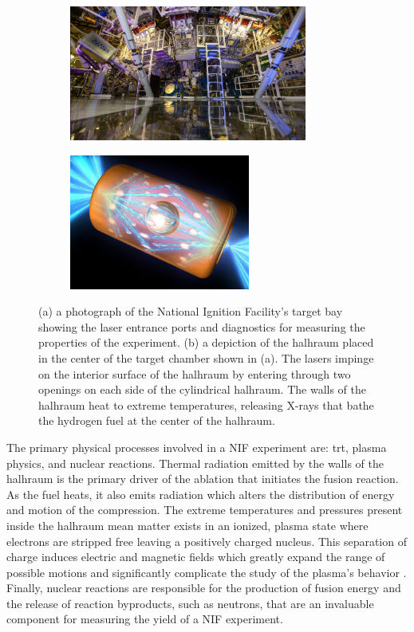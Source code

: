 \documentclass[../doc.tex]{subfiles}
\begin{document}
\begin{figure}
\centering
\begin{subfigure}{.49\textwidth}
	\centering
	\includegraphics[height=1.75in]{data/img/nif.jpg}
	\caption{}
	\label{intro:nif}
\end{subfigure}
\begin{subfigure}{.49\textwidth}
	\centering
	\includegraphics[height=1.75in]{data/img/halhraum.jpeg}
	\caption{}
	\label{intro:halhraum}
\end{subfigure}
\caption{(a) a photograph of the National Ignition Facility's target bay showing the laser entrance ports and diagnostics for measuring the properties of the experiment. (b) a depiction of the halhraum placed in the center of the target chamber shown in (a). The lasers impinge on the interior surface of the halhraum by entering through two openings on each side of the cylindrical halhraum. The walls of the halhraum heat to extreme temperatures, releasing X-rays that bathe the hydrogen fuel at the center of the halhraum. }
\end{figure}

The primary physical processes involved in a NIF experiment are: \gls{trt}, plasma physics, and nuclear reactions. Thermal radiation emitted by the walls of the halhraum is the primary driver of the ablation that initiates the fusion reaction. As the fuel heats, it also emits radiation which alters the distribution of energy and motion of the compression. The extreme temperatures and pressures present inside the halhraum mean matter exists in an ionized, plasma state where electrons are stripped free leaving a positively charged nucleus. This separation of charge induces electric and magnetic fields which greatly expand the range of possible motions and significantly complicate the study of the plasma's behavior \cite{chen2012introduction}. Finally, nuclear reactions are responsible for the production of fusion energy and the release of reaction byproducts, such as neutrons, that are an invaluable component for measuring the yield of a NIF experiment. 
\end{document}
